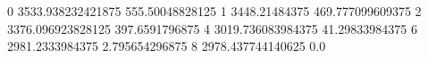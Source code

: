 0 3533.938232421875 555.50048828125
1 3448.21484375 469.777099609375
2 3376.096923828125 397.6591796875
4 3019.736083984375 41.29833984375
6 2981.2333984375 2.795654296875
8 2978.437744140625 0.0
